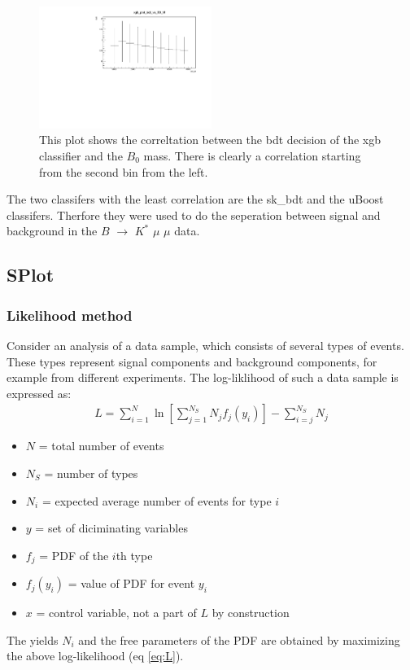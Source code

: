 \documentclass[english]{uzhpub}
\begin{document}
\begin{figure}[H]
 \centering
 \includegraphics[width=0.5\textwidth]{plots/xgb_plot_bdt_vs_B0_M}
 \caption{This plot shows the correltation between the bdt decision of the xgb classifier and the $B_0$ mass. There is clearly a correlation starting from the second bin from the left.}
 \label{fig:xgbB0M}
\end{figure}

The two classifers with the least correlation are the sk\_bdt and the uBoost classifers. Therfore they were used to do the seperation between signal and background in the $B$ $\rightarrow$ $K^{*}$ $\mu$ $\mu$ data.

\subsection{SPlot}

\subsubsection{Likelihood method}
Consider an analysis of a data sample, which consists of several types of events. These types represent signal components and background components, for example from different experiments. The log-liklihood of such a data sample is expressed as:
\begin{align}
 L = \sum_{i=1}^{N} \ln \left[ \sum_{j=1}^{N_S} N_j f_j (y_i) \right] - \sum_{i=j}^{N_S} N_j \label{eq:L}
\end{align}

\begin{itemize}
 \item $N$ = total number of events \\
 \item $N_S$ = number of types \\
 \item $N_i$ = expected average number of events for type $i$ \\
 \item $y$ = set of diciminating variables \\
 \item $f_j$ = PDF of the $i$th type \\
 \item $f_j(y_i)$ = value of PDF for event $y_i$ \\
 \item $x$ = control variable, not a part of $L$ by construction
\end{itemize}
The yields $N_i$ and the free parameters of the PDF are obtained by maximizing the above log-likelihood (eq \ref{eq:L}).
\end{document}
